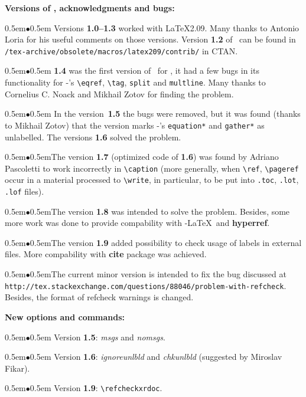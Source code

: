 \documentclass[11pt]{article}
\begin{document}
\bigskip

\def\item{\noindent\mbox{\kern0.5em$\bullet$\kern0.5em}}

\textbf{Versions of \RefCheck, acknowledgments and bugs:}

\item
Versions \textbf{1.0--1.3} worked with \LaTeX2.09.  Many
thanks to Antonio Loria for his useful comments on those versions.
Version \textbf{1.2} of \RefCheck\ can be found in
\texttt{/tex-archive/obsolete/macros/latex209/contrib/} in CTAN.

\item
\textbf{1.4} was the first version of \RefCheck\ for \LaTeXe, it had a
few bugs in its functionality for \AmS-\LaTeXe's \verb#\eqref#,
\verb#\tag#, \verb#split# and \verb#multline#.  Many thanks to
Cornelius C. Noack and Mikhail Zotov for finding the problem.

\item
In the version~\textbf{1.5} the bugs were removed, but it was found
(thanks to Mikhail Zotov) that the version marks \AmS-\LaTeXe's
\verb#equation*# and \verb#gather*# as unlabelled.  The versions
\textbf{1.6} solved the problem.

\item The version \textbf{1.7} (optimized code of \textbf{1.6}) was
found by Adriano Pascoletti to work incorrectly in \verb#\caption# (more
generally, when \verb#\ref#, \verb#\pageref# occur in a material
processed to \verb#\write#, in particular, to be put into \texttt{.toc},
\texttt{.lot}, \texttt{.lof} files).

\item The version \textbf{1.8} was intended to solve the
problem. Besides, some more work was done to provide compability with
\AmS-\LaTeX\ and \textbf{hyperref}.

\item The version \textbf{1.9} added possibility to check usage of labels in external
files. More compability with \textbf{cite} package was achieved.

\item The current minor version \textbf{\curversion} is intended to fix the bug discussed
at \\
{\small\texttt{http://tex.stackexchange.com/questions/88046/problem-with-refcheck}}.\\
Besides, the format of refcheck warnings is changed.

\bigskip

\textbf{New options and commands:}

\item
Version \textbf{1.5}: \textit{msgs\/} and \textit{nomsgs\/}.

\item
Version \textbf{1.6}: \textit{ignoreunlbld\/} and
\textit{chkunlbld\/} (suggested by Miroslav Fikar).

\item
Version \textbf{1.9}: \verb#\refcheckxrdoc#.
\end{document}
